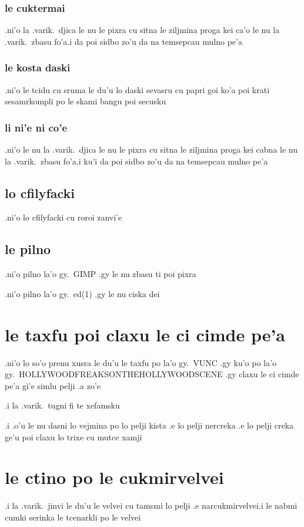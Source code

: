 \documentclass{report}
\begin{document}
\subsubsection{le cuktermai}
.ni'o la .varik.\ djica le nu le pixra cu sitna le ziljmina proga kei ca'o le nu la .varik.\ zbasu fo'a\@  .i da poi sidbo zo'u da na temsepcau mulno pe'a
\subsubsection{le kosta daski}
.ni'o le tcidu cu sruma le du'u lo daski sevasru cu papri goi ko'a poi krati sesamrkompli po le skami bangu poi secusku
\subsubsection{li ni'e ni co'e}
.ni'o le nu la .varik.\ djica le nu le pixra cu sitna le ziljmina proga kei cabna le nu la .varik.\ zbasu fo'a\@  .i ku'i da poi sidbo zo'u da na temsepcau mulno pe'a
\subsection{lo cfilyfacki}
.ni'o lo cfilyfacki cu roroi zanvi'e
\subsection{le pilno}
.ni'o pilno la'o gy.\ GIMP .gy le nu zbasu ti poi pixra

.ni'o pilno la'o gy.\ ed(1) .gy le nu ciska dei
\section{le taxfu poi claxu le ci cimde pe'a}
.ni'o lo so'o prenu xusra le du'u le taxfu po la'o gy.\ VUNC .gy ku'o po la'o gy.\ HOLLYWOODFREAKSONTHEHOLLYWOODSCENE .gy claxu le ci cimde pe'a gi'e simlu pelji .a zo'e

.i la .varik.\ tugni fi te xefamsku

.i .o'u le nu dasni lo vejmina po lo pelji kista .e lo pelji nercreka .e lo pelji creka ge'u poi claxu lo trixe cu mutce xamji
\section{le ctino po le cukmirvelvei}
.i la .varik.\ jinvi le du'u le velvei cu tamsmi lo pelji .e narcukmirvelvei\@  .i le nabmi cumki serinka le tcenarkli po le velvei
\end{document}
